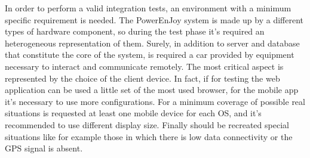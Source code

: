 In order to perform a valid integration tests, an environment with a minimum specific requirement is needed.
The PowerEnJoy system is made up by a different types of hardware component, so during the test phase it's required an heterogeneous representation of them. 
Surely, in addition to server and database that constitute the core of the system, is required a car provided by equipment necessary to interact and communicate remotely. 
The most critical aspect is represented by the choice of the client device. In fact, if for testing the web application can be used a little set of the most used browser, for the mobile app it's necessary to use more configurations. For a minimum coverage of possible real situations is requested at least one mobile device for each OS, and it's recommended to use different display size. 
Finally should be recreated special situations like for example those in which there is low data connectivity or the GPS signal is absent.
